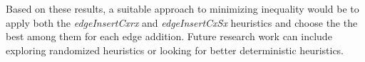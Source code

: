 Based on these results, a suitable approach to minimizing inequality would be to apply both the \textit{edgeInsertCxrx} and \textit{edgeInsertCxSx} heuristics and choose the the best among them for each edge addition. Future research work can include exploring randomized heuristics or looking for better deterministic heuristics.





